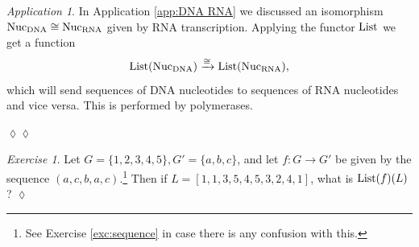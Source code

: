 \documentclass{book}
\def\tn{\textnormal}
\def\List{\tn{List}}
\def\to{\rightarrow}
\def\taking{\colon}
\def\iso{\cong}
\newcommand{\To}[1]{\xrightarrow{#1}}
\theoremstyle{remark}
\newtheorem{exc}[subsubsection]{Exercise}
\newenvironment{exercise}{\begin{exc}}{\hspace*{\fill}$\lozenge$\end{exc}}
\newtheorem{app}[subsubsection]{Application}
\newenvironment{application}{\begin{app}}{\hspace*{\fill}$\lozenge\lozenge$\end{app}}
\theoremstyle{definition}
\begin{document}
\begin{application}\label{app:polymerase}
In Application \ref{app:DNA RNA} we discussed an isomorphism $\tn{Nuc}_\tn{DNA}\iso\tn{Nuc}_\tn{RNA}$ given by RNA transcription. Applying the functor $\List$ we get a function $$\List(\tn{Nuc}_\tn{DNA})\To{\iso}\List(\tn{Nuc}_\tn{RNA}),$$ which will send sequences of DNA nucleotides to sequences of RNA nucleotides and vice versa. This is performed by polymerases.

\end{application}

\begin{exercise}\label{exc:list as functor}
Let $G=\{1,2,3,4,5\}, G'=\{a,b,c\}$, and let $f\taking G\to G'$ be given by the sequence $(a,c,b,a,c)$.\footnote{See Exercise \ref{exc:sequence} in case there is any confusion with this.} Then if $L=[1,1,3,5,4,5,3,2,4,1]$, what is $\List(f)(L)$?
\end{exercise}
\end{document}
